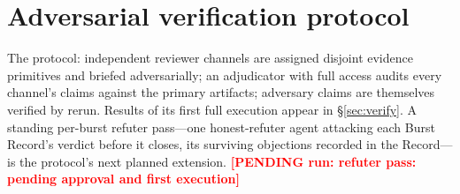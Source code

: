 \documentclass[twocolumn]{aastex631}
\newcommand{\PENDING}[1]{\textbf{\textcolor{red}{[PENDING run: #1]}}}
\begin{document}
\section{Adversarial verification protocol} \label{app:verify}
The protocol: independent reviewer channels are assigned disjoint
evidence primitives and briefed adversarially; an adjudicator with
full access audits every channel's claims against the primary artifacts;
adversary claims are themselves verified by rerun. Results of its first
full execution appear in \S\ref{sec:verify}. A standing per-burst refuter
pass---one honest-refuter agent attacking each Burst Record's verdict before
it closes, its surviving objections recorded in the Record---is the
protocol's next planned extension. \PENDING{refuter pass: pending approval
and first execution}


\end{document}
